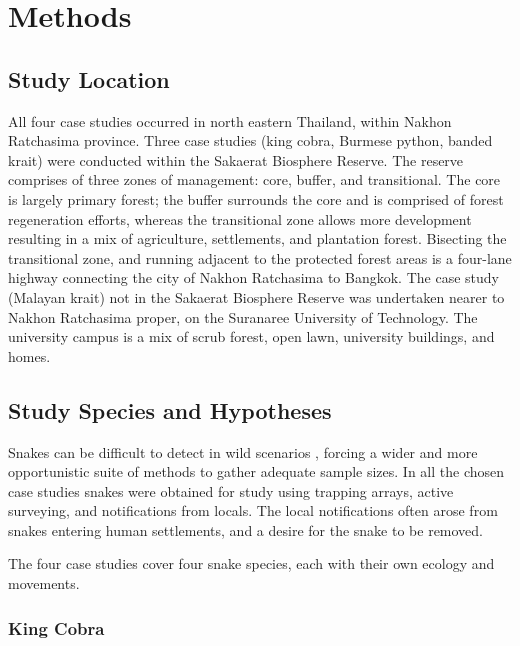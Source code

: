 \documentclass[10pt,a4paper]{article}
\begin{document}
\hypertarget{methods}{%
\section{Methods}\label{methods}}

\hypertarget{study-location}{%
\subsection{Study Location}\label{study-location}}

All four case studies occurred in north eastern Thailand, within Nakhon Ratchasima province.
Three case studies (king cobra, Burmese python, banded krait) were conducted within the Sakaerat Biosphere Reserve.
The reserve comprises of three zones of management: core, buffer, and transitional.
The core is largely primary forest; the buffer surrounds the core and is comprised of forest regeneration efforts, whereas the transitional zone allows more development resulting in a mix of agriculture, settlements, and plantation forest.
Bisecting the transitional zone, and running adjacent to the protected forest areas is a four-lane highway connecting the city of Nakhon Ratchasima to Bangkok.
The case study (Malayan krait) not in the Sakaerat Biosphere Reserve was undertaken nearer to Nakhon Ratchasima proper, on the Suranaree University of Technology.
The university campus is a mix of scrub forest, open lawn, university buildings, and homes.

\hypertarget{study-species-and-hypotheses}{%
\subsection{Study Species and Hypotheses}\label{study-species-and-hypotheses}}

Snakes can be difficult to detect in wild scenarios , forcing a wider and more opportunistic suite of methods to gather adequate sample sizes.
In all the chosen case studies snakes were obtained for study using trapping arrays, active surveying, and notifications from locals.
The local notifications often arose from snakes entering human settlements, and a desire for the snake to be removed.

The four case studies cover four snake species, each with their own ecology and movements.

\hypertarget{king-cobra}{%
\subsubsection{King Cobra}\label{king-cobra}}
\end{document}
